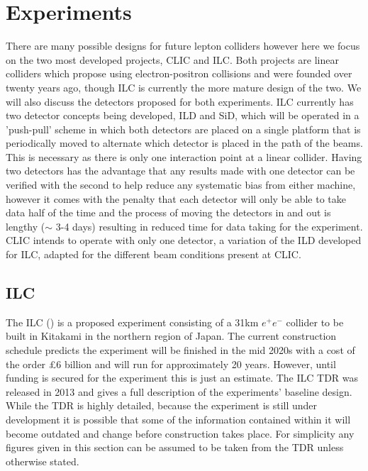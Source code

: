 \chapter{Experiments}
\label{experiments}
There are many possible designs for future lepton colliders \cite{Lipton:2012du,Koratzinos:2014cla,CEPC-SPPCStudyGroup:2015csa} however here we focus on the two most developed projects, \ac{CLIC} and \ac{ILC}. Both projects are linear colliders which propose using electron-positron collisions and were founded over twenty years ago, though \ac{ILC} is currently the more mature design of the two. We will also discuss the detectors proposed for both experiments. \ac{ILC} currently has two detector concepts being developed, \ac{ILD} and \ac{SiD}, which will be operated in a 'push-pull' scheme in which both detectors are placed on a single platform that is periodically moved to alternate which detector is placed in the path of the beams. This is necessary as there is only one interaction point at a linear collider. Having two detectors has the advantage that any results made with one detector can be verified with the second to help reduce any systematic bias from either machine, however it comes with the penalty that each detector will only be able to take data half of the time and the process of moving the detectors in and out is lengthy ($\sim$ 3-4 days) resulting in reduced time for data taking for the experiment. \ac{CLIC} intends to operate with only one detector, a variation of the \ac{ILD} developed for \ac{ILC}, adapted for the different beam conditions present at CLIC. 

\section{ILC}

The ILC () is a proposed experiment consisting of a 31km ${e^+e^-}$ collider to be built in Kitakami in the northern region of Japan. The current construction schedule predicts the experiment will be finished in the mid 2020s with a cost of the order \pounds6 billion and will run for approximately 20 years. However, until funding is secured for the experiment this is just an estimate. The \ac{ILC} \ac{TDR} \cite{ILCTDR} was released in 2013 and gives a full description of the experiments' baseline design. While the \ac{TDR} is highly detailed, because the experiment is still under development it is possible that some of the information contained within it will become outdated and change before construction takes place. For simplicity any figures given in this section can be assumed to be taken from the \ac{TDR} unless otherwise stated.

